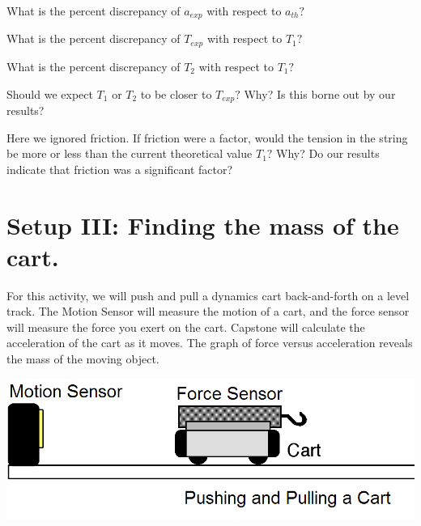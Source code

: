 \documentclass[main.tex]{subfiles}
\begin{document}
\begin{question}
What is the percent discrepancy of $a_{exp}$ with respect to $a_{th}?$
\end{question}
\begin{question}
What is the percent discrepancy of $T_{exp}$ with respect to $T_1?$
\end{question}
\begin{question}
What is the percent discrepancy of $T_2$ with respect to $T_1?$
\end{question}
\begin{question}
Should we expect $T_1$ or $T_2$ to be closer to $T_{exp}?$ Why? Is this borne out by our results?
\end{question}
\begin{question}
Here we ignored friction. If friction were a factor, would the tension in the string be more or less than the current theoretical value $T_1?$ Why? Do our results indicate that friction was a significant factor?
\end{question}

\section{Setup III: Finding the mass of the cart.}
For this activity, we will push and pull a dynamics cart back-and-forth on a level track. The Motion Sensor will measure the motion of a cart, and the force sensor will measure the force you exert on the cart. Capstone will calculate the acceleration of the cart as it moves. The graph of force versus acceleration reveals the mass of the moving object.

\includegraphics[width=\textwidth]{Force_3_Setup}
\end{document}
